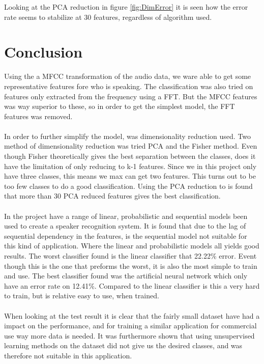 Looking at the PCA reduction in figure \ref{fig:DimError} it is seen how the error rate seems to stabilize at 30 features, regardless of algorithm used.


\section{Conclusion}
Using the a MFCC transformation of the audio data, we ware able to get some representative features fore who is speaking. The classification was also tried on features only extracted from the frequency using a FFT. But the MFCC features was way superior to these, so in order to get the simplest model, the FFT features was removed. \\\ \\

In order to further simplify the model, was dimensionality reduction used. Two method of dimensionality reduction was tried PCA and the Fisher method. Even though Fisher theoretically gives the best separation between the classes, does it have the limitation of only reducing to k-1 features. Since we in this project only have three classes, this means we max can get two features. This turns out to be too few classes to do a good classification. Using the PCA reduction to is found that more than 30 PCA reduced features gives the best classification.  \\\ \\ 

In the project have a range of linear, probabilistic and sequential models been used to create a speaker recognition system. It is found that due to the lag of sequential dependency in the features, is the sequential model not suitable for this kind of application. Where the linear and probabilistic models all yields good results. The worst classifier found is the linear classifier that 22.22\% error. Event though this is the one that preforms the worst, it is also the most simple to train and use. The best classifier found was the artificial neural network which only have an error rate on 12.41\%. Compared to the linear classifier is this a very hard to train, but is relative easy to use, when trained. \\\ \\  

When looking at the test result it is clear that the fairly small dataset have had a impact on the performance, and for training a similar application for commercial use way more data is needed. It was furthermore shown that using unsupervised learning methods on the dataset did not give us the desired classes, and was therefore not suitable in this application.
